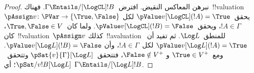 \documentclass[../../../include/open-logic-section]{subfiles}
\begin{document}
\begin{proof}
  نبرهن المعاكس النقيض. افترض~$\Gamma \Entails/[\LogCL] !B$.
  فهناك~!!{valuation}~$\pAssign v\colon \PVar \to
  \{\True, \False\}$ يحقق~$\pValue v[\LogCL](!A) = \True$ لكل
  $!A \in \Gamma$، ويحقق~$\pValue v[\LogCL](!B) = \False$.
  ولما كان~$\True, \False \in V$، كان~!!{valuation}~$\pAssign v$
  كذلك~!!a{valuation} للمنطق~$\Log L$. ثم تفيد 
  أن~$\pValue v[\Log L](!A) = \True$ لكل~$!A \in \Gamma$، وأن
  $\pValue v[\Log L](!B) = \False$. ومع~$\True \in V^+$ و
  $\False \notin V^+$، فتتحقق~$\pSat{v}{\Gamma}[\Log L]$
  وتتحقق~$\pSat/{v}{!B}[\Log L]$؛ أي
  $\Gamma \Entails/[\Log L] !B$.
\end{proof}
\end{document}
